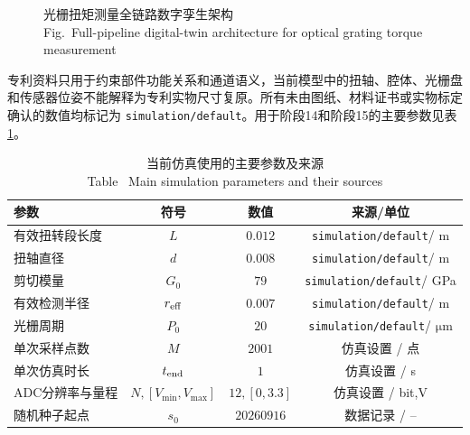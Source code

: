 \documentclass[UTF8,a4paper,12pt]{ctexart}
\newcommand{\bicaption}[2]{\caption{#1\\[-0.2em]\small Fig.\thefigure\ #2}}
\newcommand{\bitablecaption}[2]{\caption{#1\\[-0.2em]\small Table \thetable\ #2}}
\newcommand{\simdefault}{\texttt{simulation/default}}
\begin{document}
\begin{figure}[htbp]
  \centering
  \bicaption{光栅扭矩测量全链路数字孪生架构}{Full-pipeline digital-twin architecture for optical grating torque measurement}
  \label{fig:architecture}
\end{figure}

专利资料只用于约束部件功能关系和通道语义，当前模型中的扭轴、腔体、光栅盘和传感器位姿不能解释为专利实物尺寸复原。所有未由图纸、材料证书或实物标定确认的数值均标记为 \simdefault。用于阶段14和阶段15的主要参数见表\ref{tab:parameters}。

\begin{table}[htbp]
  \centering
  \bitablecaption{当前仿真使用的主要参数及来源}{Main simulation parameters and their sources}
  \label{tab:parameters}
  \begin{tabular}{lccc}
    \toprule
    参数 & 符号 & 数值 & 来源/单位 \\
    \midrule
    有效扭转段长度 & $L$ & $0.012$ & \simdefault / m \\
    扭轴直径 & $d$ & $0.008$ & \simdefault / m \\
    剪切模量 & $G_0$ & $79$ & \simdefault / GPa \\
    有效检测半径 & $r_{\rm eff}$ & $0.007$ & \simdefault / m \\
    光栅周期 & $P_0$ & $20$ & \simdefault / $\si{\micro\metre}$ \\
    单次采样点数 & $M$ & $2001$ & 仿真设置 / 点 \\
    单次仿真时长 & $t_{\rm end}$ & $1$ & 仿真设置 / s \\
    ADC分辨率与量程 & $N,[V_{\min},V_{\max}]$ & $12,[0,3.3]$ & 仿真设置 / bit,V \\
    随机种子起点 & $s_0$ & $20260916$ & 数据记录 / -- \\
    \bottomrule
  \end{tabular}
\end{table}
\end{document}
